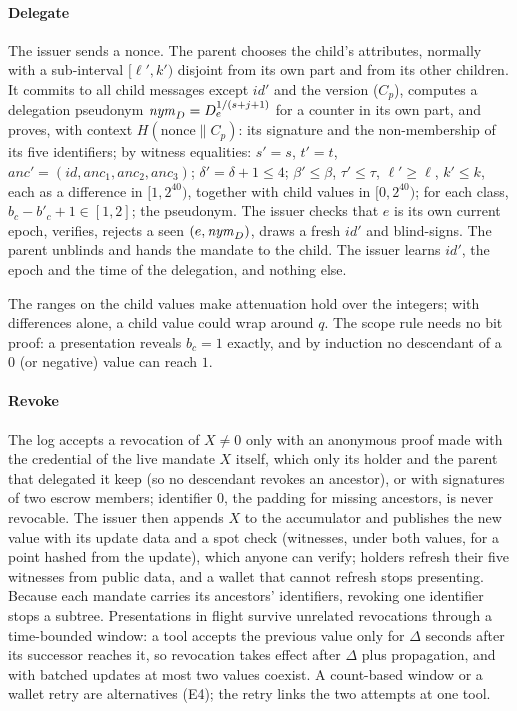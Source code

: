\paragraph*{Delegate} The issuer sends a nonce. The parent chooses the child's attributes, normally with a sub-interval $[\ell',k')$ disjoint from its own part and from its other children. It commits to all child messages except $\mathit{id}'$ and the version ($C_p$), computes a delegation pseudonym $\mathit{nym}_D=D_e^{1/(s+j+1)}$ for a counter in its own part, and proves, with context $H(\text{nonce}\|C_p)$:
its signature and the non-membership of its five identifiers; by witness equalities: $s'=s$, $t'=t$, $\mathit{anc}'=(\mathit{id},\mathit{anc}_1,\mathit{anc}_2,\mathit{anc}_3)$; $\delta'=\delta+1\le4$; $\beta'\le\beta$, $\tau'\le\tau$, $\ell'\ge\ell$, $k'\le k$, each as a difference in $[1,2^{40})$, together with child values in $[0,2^{40})$; for each class, $b_c-b'_c+1\in[1,2]$; the pseudonym.
The issuer checks that $e$ is its own current epoch, verifies, rejects a seen $(e,\mathit{nym}_D)$, draws a fresh $\mathit{id}'$ and blind-signs. The parent unblinds and hands the mandate to the child. The issuer learns $\mathit{id}'$, the epoch and the time of the delegation, and nothing else.

The ranges on the child values make attenuation hold over the integers; with differences alone, a child value could wrap around $q$. The scope rule needs no bit proof: a presentation reveals $b_c=1$ exactly, and by induction no descendant of a $0$ (or negative) value can reach $1$.

\paragraph*{Revoke} The log accepts a revocation of $X\neq0$ only with an anonymous proof made with the credential of the live mandate $X$ itself, which only its holder and the parent that delegated it keep (so no descendant revokes an ancestor), or with signatures of two escrow members; identifier $0$, the padding for missing ancestors, is never revocable. The issuer then appends $X$ to the accumulator and publishes the new value with its update data and a spot check (witnesses, under both values, for a point hashed from the update), which anyone can verify; holders refresh their five witnesses from public data, and a wallet that cannot refresh stops presenting. Because each mandate carries its ancestors' identifiers, revoking one identifier stops a subtree. Presentations in flight survive unrelated revocations through a time-bounded window: a tool accepts the previous value only for $\Delta$ seconds after its successor reaches it, so revocation takes effect after $\Delta$ plus propagation, and with batched updates at most two values coexist. A count-based window or a wallet retry are alternatives (E4); the retry links the two attempts at one tool.


